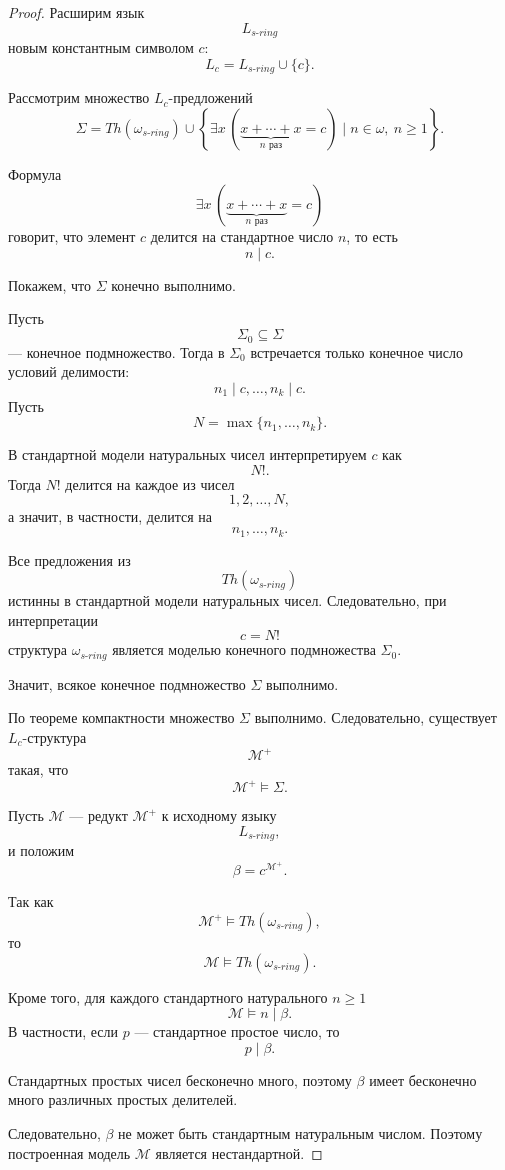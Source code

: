 \documentclass[12pt,a4paper,oneside,openany]{book}
\theoremstyle{definition}
\theoremstyle{plain}
\theoremstyle{remark}
\begin{document}
\begin{proof}
Расширим язык
\[
L_{s\text{-}ring}
\]
новым константным символом \(c\):
\[
L_c=L_{s\text{-}ring}\cup\{c\}.
\]

Рассмотрим множество \(L_c\)-предложений
\[
\Sigma
=
Th(\omega_{s\text{-}ring})
\cup
\left\{
\exists x\,
\left(
\underbrace{x+\cdots+x}_{n\text{ раз}}=c
\right)
\mid n\in\omega,\ n\ge 1
\right\}.
\]

Формула
\[
\exists x\,
\left(
\underbrace{x+\cdots+x}_{n\text{ раз}}=c
\right)
\]
говорит, что элемент \(c\) делится на стандартное число \(n\), то есть
\[
n\mid c.
\]

Покажем, что \(\Sigma\) конечно выполнимо.

Пусть
\[
\Sigma_0\subseteq\Sigma
\]
— конечное подмножество. Тогда в \(\Sigma_0\) встречается только конечное число условий делимости:
\[
n_1\mid c,\ldots,n_k\mid c.
\]
Пусть
\[
N=\max\{n_1,\ldots,n_k\}.
\]

В стандартной модели натуральных чисел интерпретируем \(c\) как
\[
N!.
\]
Тогда \(N!\) делится на каждое из чисел
\[
1,2,\ldots,N,
\]
а значит, в частности, делится на
\[
n_1,\ldots,n_k.
\]

Все предложения из
\[
Th(\omega_{s\text{-}ring})
\]
истинны в стандартной модели натуральных чисел. Следовательно, при интерпретации
\[
c=N!
\]
структура \(\omega_{s\text{-}ring}\) является моделью конечного подмножества \(\Sigma_0\).

Значит, всякое конечное подмножество \(\Sigma\) выполнимо.

По теореме компактности множество \(\Sigma\) выполнимо. Следовательно, существует \(L_c\)-структура
\[
\mathcal M^+
\]
такая, что
\[
\mathcal M^+\models\Sigma.
\]

Пусть \(\mathcal M\) — редукт \(\mathcal M^+\) к исходному языку
\[
L_{s\text{-}ring},
\]
и положим
\[
\beta=c^{\mathcal M^+}.
\]

Так как
\[
\mathcal M^+\models Th(\omega_{s\text{-}ring}),
\]
то
\[
\mathcal M\models Th(\omega_{s\text{-}ring}).
\]

Кроме того, для каждого стандартного натурального \(n\ge 1\)
\[
\mathcal M\models n\mid \beta.
\]
В частности, если \(p\) — стандартное простое число, то
\[
p\mid\beta.
\]

Стандартных простых чисел бесконечно много, поэтому \(\beta\) имеет бесконечно много различных простых делителей.

Следовательно, \(\beta\) не может быть стандартным натуральным числом. Поэтому построенная модель \(\mathcal M\) является нестандартной.
\end{proof}
\end{document}
